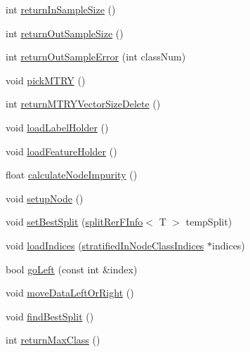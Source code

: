 \begin{DoxyCompactItemize}
\item 
int \hyperlink{classfp_1_1unprocessedRerFNode_ae8b096a92819dbb811d1319d5c4eaecd}{return\+In\+Sample\+Size} ()
\item 
int \hyperlink{classfp_1_1unprocessedRerFNode_a850d04831326a6d700258bc8526cf7a2}{return\+Out\+Sample\+Size} ()
\item 
int \hyperlink{classfp_1_1unprocessedRerFNode_af920a23a290c9552c246a2913be55761}{return\+Out\+Sample\+Error} (int class\+Num)
\item 
void \hyperlink{classfp_1_1unprocessedRerFNode_af4593ac3feb0551307f5a863e109dd30}{pick\+M\+T\+RY} ()
\item 
int \hyperlink{classfp_1_1unprocessedRerFNode_a436990a7a7e08ded050ffe55c585e605}{return\+M\+T\+R\+Y\+Vector\+Size\+Delete} ()
\item 
void \hyperlink{classfp_1_1unprocessedRerFNode_ad4ed23c3eecd133c0f194b94d7e75404}{load\+Label\+Holder} ()
\item 
void \hyperlink{classfp_1_1unprocessedRerFNode_a6510faa628fda49d672dcd1b88a3834b}{load\+Feature\+Holder} ()
\item 
float \hyperlink{classfp_1_1unprocessedRerFNode_ac86ccad68a93a1957b7563244c03c0c0}{calculate\+Node\+Impurity} ()
\item 
void \hyperlink{classfp_1_1unprocessedRerFNode_a5ec1c45ede99474478d616f748c733ba}{setup\+Node} ()
\item 
void \hyperlink{classfp_1_1unprocessedRerFNode_ac31049fede0262a8879905802884fe6f}{set\+Best\+Split} (\hyperlink{classfp_1_1splitRerFInfo}{split\+Rer\+F\+Info}$<$ T $>$ temp\+Split)
\item 
void \hyperlink{classfp_1_1unprocessedRerFNode_aee896249351b674045d1cecd653cb446}{load\+Indices} (\hyperlink{classfp_1_1stratifiedInNodeClassIndices}{stratified\+In\+Node\+Class\+Indices} $\ast$indices)
\item 
bool \hyperlink{classfp_1_1unprocessedRerFNode_a4c4e6bb795c327b38301610d0158735a}{go\+Left} (const int \&index)
\item 
void \hyperlink{classfp_1_1unprocessedRerFNode_a6b0103f44984a79d6a0871d3e1866b34}{move\+Data\+Left\+Or\+Right} ()
\item 
void \hyperlink{classfp_1_1unprocessedRerFNode_a92456de8922f84605246d2a1800434a1}{find\+Best\+Split} ()
\item 
int \hyperlink{classfp_1_1unprocessedRerFNode_a656fca7854eae97dae1b93082d703606}{return\+Max\+Class} ()
\end{DoxyCompactItemize}

